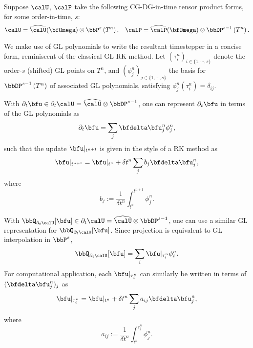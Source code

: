 
    \begin{example}
        Suppose $\calU$, $\calP$ take the following CG-DG-in-time tensor product forms, for some order-in-time, $s$:
        \begin{align}
            \calU  =  \widehat{\calU}(\bfOmega)\otimes\bbP^{s}\left(T^{n}\right),  &&
            \calP  =  \widehat{\calP}(\bfOmega)\otimes\bbDP^{s - 1}\left(T^{n}\right).
        \end{align}

        We make use of GL polynomials to write the resultant timestepper in a concise form, reminiscent of the classical GL RK method. Let $\left(\tau^{n}_{i}\right)_{i \in \{1, \cdots, s\}}$ denote the order-$s$ (shifted) GL points on $T^{n}$, and $\left(\phi^{n}_{j}\right)_{j \in \{1, \cdots, s\}}$ the basis for $\bbDP^{s - 1}\left(T^{n}\right)$ of associated GL polynomials, satisfying $\phi^{n}_{j}(\tau^{n}_{i}) = \delta_{ij}$.

        With $\partial_{t}\bfu \in \partial_{t}\calU = \widehat{\calU}\otimes\bbDP^{s - 1}$, one can represent $\partial_{t}\bfu$ in terms of the GL polynomials as
        \begin{equation}
            \partial_{t}\bfu  =  \sum_{j}\bfdelta\bfu^{n}_{j}\phi^{n}_{j},
        \end{equation}
        such that the update $\bfu|_{t^{n + 1}}$ is given in the style of a RK method as
        \begin{equation}
            \bfu|_{t^{n + 1}}  =  \bfu|_{t^{n}} + \delta t^{n}\sum_{j}b_{j}\bfdelta\bfu^{n}_{j},
        \end{equation}
        where
        \begin{equation}\label{eqn:b_j definition}
            b_{j}  :=  \frac{1}{\delta t^{n}}\int_{t^{n}}^{t^{n + 1}}\phi^{n}_{j}.
        \end{equation}

        With $\bbQ_{\partial_{t}\calU}[\bfu] \in \partial_{t}\calU = \widehat{\calU}\otimes\bbDP^{s - 1}$, one can use a similar GL representation for $\bbQ_{\partial_{t}\calU}[\bfu]$. Since projection is equivalent to GL interpolation in $\bbP^{s}$,
        \begin{equation}
            \bbQ_{\partial_{t}\calU}[\bfu]  =  \sum_{i}\bfu|_{\tau^{n}_{i}}\phi^{n}_{i}.
        \end{equation}
        For computational application, each $\bfu|_{\tau^{n}_{i}}$ can similarly be written in terms of $(\bfdelta\bfu^{n}_{j})_{j}$ as
        \begin{equation}
            \bfu|_{\tau^{n}_{i}}  =  \bfu|_{t^{n}} + \delta t^{n}\sum_{j}a_{ij}\bfdelta\bfu^{n}_{j},
        \end{equation}
        where
        \begin{equation}\label{eqn:a_ij definition}
            a_{ij}  :=  \frac{1}{\delta t^{n}}\int_{t^{n}}^{\tau^{n}_{i}}\phi^{n}_{j}.
        \end{equation}
        

\end{example}
